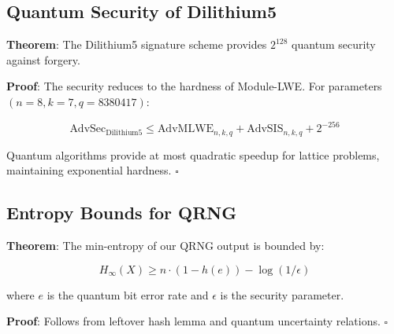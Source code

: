 \documentclass[11pt,a4paper]{article}
\begin{document}
\subsection{Quantum Security of Dilithium5}

\textbf{Theorem}: The Dilithium5 signature scheme provides $2^{128}$ quantum security against forgery.

\textbf{Proof}: The security reduces to the hardness of Module-LWE. For parameters $(n=8, k=7, q=8380417)$:

\begin{equation}
\text{AdvSec}_{\text{Dilithium5}} \leq \text{AdvMLWE}_{n,k,q} + \text{AdvSIS}_{n,k,q} + 2^{-256}
\end{equation}

Quantum algorithms provide at most quadratic speedup for lattice problems, maintaining exponential hardness. $\square$

\subsection{Entropy Bounds for QRNG}

\textbf{Theorem}: The min-entropy of our QRNG output is bounded by:

\begin{equation}
H_{\infty}(X) \geq n \cdot (1 - h(e)) - \log(1/\epsilon)
\end{equation}

where $e$ is the quantum bit error rate and $\epsilon$ is the security parameter.

\textbf{Proof}: Follows from leftover hash lemma and quantum uncertainty relations. $\square$
\end{document}
